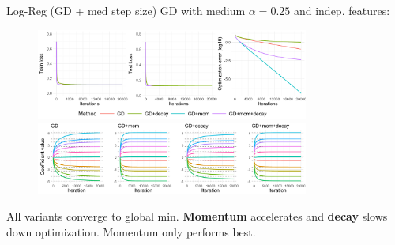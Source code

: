 \documentclass[11pt,compress,t,notes=noshow, xcolor=table]{beamer}
\begin{document}
\begin{vbframe}{Log-Reg (GD + med step size)}
\vspace{-0.4cm}
GD with medium $\alpha=0.25$ and indep. features:
\begin{figure}
            \includegraphics[width=0.8\textwidth]{slides/04-multivariate-first-order/figure_man/simu_linmod/GD_log_med_lr_iters.pdf} \\
             \includegraphics[width=0.8\textwidth]{slides/04-multivariate-first-order/figure_man/simu_linmod/GD_log_coef_med.pdf}\\
            \begin{footnotesize}
            \end{footnotesize}
\end{figure}
All variants converge to global min. \textbf{Momentum} accelerates
and \textbf{decay} slows down optimization. Momentum only performs best.
\end{vbframe}
\end{document}
